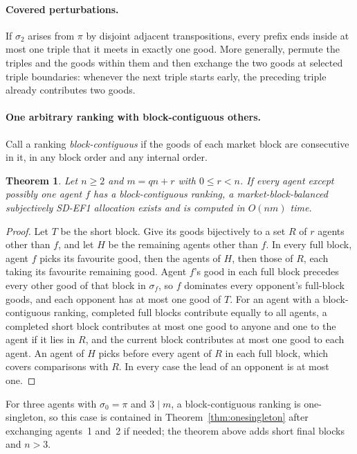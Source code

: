 \documentclass[11pt]{article}
\newtheorem{theorem}{Theorem}[section]
\theoremstyle{definition}
\begin{document}
\paragraph{Covered perturbations.}
If $\sigma_2$ arises from $\pi$ by disjoint adjacent transpositions, every prefix ends inside at most one triple that it meets in exactly one good. More generally, permute the triples and the goods within them and then exchange the two goods at selected triple boundaries: whenever the next triple starts early, the preceding triple already contributes two goods.

\paragraph{One arbitrary ranking with block-contiguous others.}
Call a ranking \emph{block-contiguous} if the goods of each market block are consecutive in it, in any block order and any internal order.
\begin{theorem}
Let $n\ge2$ and $m=qn+r$ with $0\le r<n$. If every agent except possibly one agent $f$ has a block-contiguous ranking, a market-block-balanced subjectively SD-EF1 allocation exists and is computed in $O(nm)$ time.
\end{theorem}
\begin{proof}
Let $T$ be the short block. Give its goods bijectively to a set $R$ of $r$ agents other than $f$, and let $H$ be the remaining agents other than $f$. In every full block, agent $f$ picks its favourite good, then the agents of $H$, then those of $R$, each taking its favourite remaining good. Agent $f$'s good in each full block precedes every other good of that block in $\sigma_f$, so $f$ dominates every opponent's full-block goods, and each opponent has at most one good of $T$. For an agent with a block-contiguous ranking, completed full blocks contribute equally to all agents, a completed short block contributes at most one good to anyone and one to the agent if it lies in $R$, and the current block contributes at most one good to each agent. An agent of $H$ picks before every agent of $R$ in each full block, which covers comparisons with $R$. In every case the lead of an opponent is at most one.
\end{proof}
For three agents with $\sigma_0=\pi$ and $3\mid m$, a block-contiguous ranking is one-singleton, so this case is contained in Theorem~\ref{thm:onesingleton} after exchanging agents~1 and~2 if needed; the theorem above adds short final blocks and $n>3$.
\end{document}
